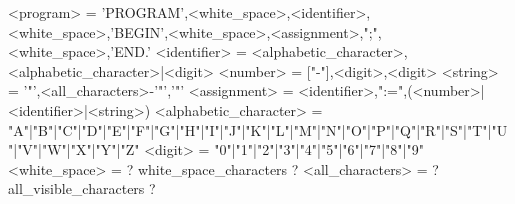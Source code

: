 \documentclass{article}
\begin{document}
\begin{grammar}
    <program> = 	'PROGRAM',<white_space>,<identifier>,<white_space>,'BEGIN',<white_space>,{<assignment>,";",<white_space>},'END.'
    <identifier> = 	<alphabetic_character>,{<alphabetic_character>|<digit>}
    <number> = 	["-"],<digit>,{<digit>}
    <string> = 	'"',{<all_characters>-'"'},'"'
    <assignment> = 	<identifier>,":=",(<number>|<identifier>|<string>)
    <alphabetic_character> = 	"A"|"B"|"C"|"D"|"E"|"F"|"G"|"H"|"I"|"J"|"K"|"L"|"M"|"N"|"O"|"P"|"Q"|"R"|"S"|"T"|"U"|"V"|"W"|"X"|"Y"|"Z"
    <digit> = 	"0"|"1"|"2"|"3"|"4"|"5"|"6"|"7"|"8"|"9"
    <white_space> = 	? white_space_characters ?
    <all_characters> = 	? all_visible_characters ?
    \end{grammar}
\end{document}
